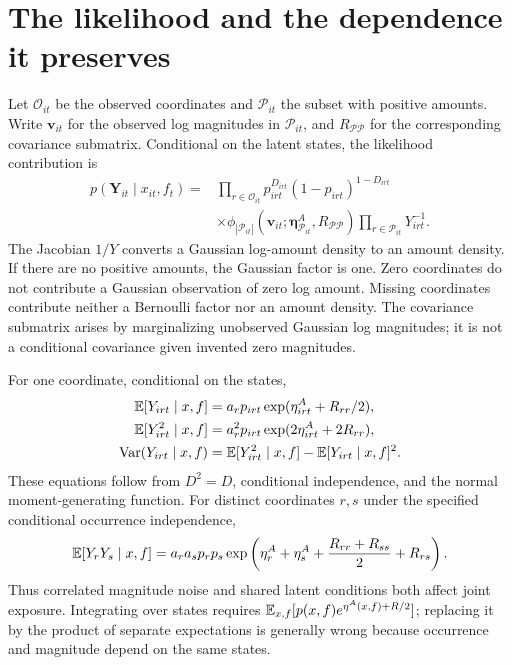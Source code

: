\section{The likelihood and the dependence it preserves}
Let $\mathcal O_{it}$ be the observed coordinates and $\mathcal P_{it}$ the subset with positive amounts. Write $\bm v_{it}$ for the observed log magnitudes in $\mathcal P_{it}$, and $R_{\mathcal P\mathcal P}$ for the corresponding covariance submatrix. Conditional on the latent states, the likelihood contribution is
\begin{align}
p(\bm Y_{it}\mid x_{it},f_t)
={}&\prod_{r\in\mathcal O_{it}}p_{irt}^{D_{irt}}(1-p_{irt})^{1-D_{irt}}\nonumber\\
&\times\phi_{|\mathcal P_{it}|}
 (\bm v_{it};\bm\eta^A_{\mathcal P_{it}},R_{\mathcal P\mathcal P})
 \prod_{r\in\mathcal P_{it}}Y_{irt}^{-1}.
\label{eq:hurdlelik}
\end{align}
The Jacobian $1/Y$ converts a Gaussian log-amount density to an amount density. If there are no positive amounts, the Gaussian factor is one. Zero coordinates do not contribute a Gaussian observation of zero log amount. Missing coordinates contribute neither a Bernoulli factor nor an amount density. The covariance submatrix arises by marginalizing unobserved Gaussian log magnitudes; it is not a conditional covariance given invented zero magnitudes.

For one coordinate, conditional on the states,
\begin{align}
\mathbb E[Y_{irt}\mid x,f]&=a_r p_{irt}
 \exp(\eta^A_{irt}+R_{rr}/2),\label{eq:hurdlemean}\\
\mathbb E[Y_{irt}^2\mid x,f]&=a_r^2p_{irt}
 \exp(2\eta^A_{irt}+2R_{rr}),\\
\operatorname{Var}(Y_{irt}\mid x,f)&=\mathbb E[Y_{irt}^2\mid x,f]-\mathbb E[Y_{irt}\mid x,f]^2.
\end{align}
These equations follow from $D^2=D$, conditional independence, and the normal moment-generating function. For distinct coordinates $r,s$ under the specified conditional occurrence independence,
\begin{equation}
\mathbb E[Y_rY_s\mid x,f]
=a_ra_s p_rp_s\exp\left(\eta_r^A+\eta_s^A+
\frac{R_{rr}+R_{ss}}{2}+R_{rs}\right).
\end{equation}
Thus correlated magnitude noise and shared latent conditions both affect joint exposure. Integrating over states requires $\mathbb E_{x,f}[p(x,f)e^{\eta^A(x,f)+R/2}]$; replacing it by the product of separate expectations is generally wrong because occurrence and magnitude depend on the same states.

